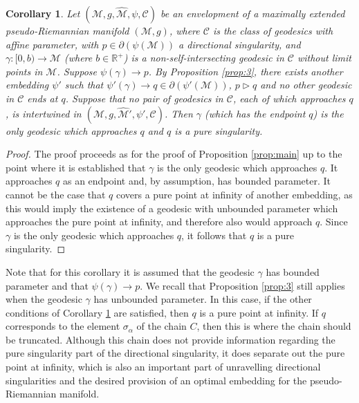 \documentclass[pdflatex,sn-mathphys-num]{sn-jnl}
\newtheorem{cor}[theorem]{Corollary}
\theoremstyle{definition}
\begin{document}
\begin{cor}\label{cor:directional}
    Let $(\mathcal{M},g,\hat{\mathcal{M}},\psi,\mathcal{C})$ be an envelopment of a maximally extended pseudo-Riemannian manifold $(\mathcal{M},g)$, where $\mathcal{C}$ is the class of geodesics with affine parameter, with $p \in \partial(\psi(\mathcal{M}))$ a directional singularity, and $\gamma: [0,b) \rightarrow \mathcal{M}$ (where $b \in \mathbb{R}^+$) is a non-self-intersecting geodesic in $\mathcal{C}$ without limit points in $\mathcal{M}$. Suppose $\psi(\gamma) \rightarrow p$. By Proposition \ref{prop:3}, there exists another embedding $\psi'$ such that $\psi'(\gamma) \rightarrow q \in \partial(\psi'(\mathcal{M}))$, $p \vartriangleright q$ and no other geodesic in $\mathcal{C}$ ends at $q$. Suppose that no pair of geodesics in $\mathcal{C}$, each of which approaches $q$, is intertwined in $(\mathcal{M},g,\hat{\mathcal{M}}',\psi',\mathcal{C})$. Then $\gamma$ (which has the endpoint $q$) is the only geodesic which approaches $q$ and $q$ is a pure singularity.
\end{cor}

\begin{proof}
The proof proceeds as for the proof of Proposition \ref{prop:main} up to the point where it is established that $\gamma$ is the only geodesic which approaches $q$. It approaches $q$ as an endpoint and, by assumption, has bounded parameter. It cannot be the case that $q$ covers a pure point at infinity of another embedding, as this would imply the existence of a geodesic with unbounded parameter which approaches the pure point at infinity, and therefore also would approach $q$. Since $\gamma$ is the only geodesic which approaches $q$, it follows that $q$ is a pure singularity.
\end{proof}

Note that for this corollary it is assumed that the geodesic $\gamma$ has bounded parameter and that $\psi(\gamma) \rightarrow p$. We recall that Proposition \ref{prop:3} still applies when the geodesic $\gamma$ has unbounded parameter. In this case, if the other conditions of Corollary \ref{cor:directional} are satisfied, then $q$ is a pure point at infinity. If $q$ corresponds to the element $\sigma_{\alpha}$ of the chain $C$, then this is where the chain should be truncated. Although this chain does not provide information regarding the pure singularity part of the directional singularity, it does separate out the pure point at infinity, which is also an important part of unravelling directional singularities and the desired provision of an optimal embedding for the pseudo-Riemannian manifold.
\end{document}
